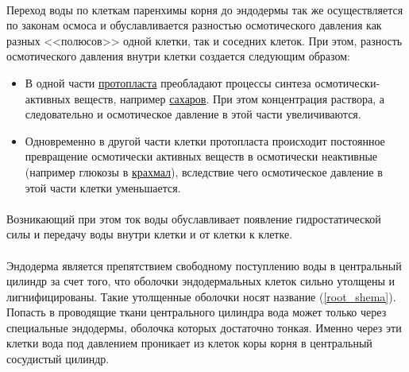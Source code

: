 \paragraph*{}Переход воды по клеткам паренхимы корня до эндодермы так же осуществляется по законам осмоса и обуславливается разностью осмотического давления как разных <<полюсов>> одной клетки, так и соседних клеток. При этом, разность осмотического давления внутри клетки создается следующим образом: 

\begin{itemize}

\item В одной части \hyperlink{protoplast}{протопласта} преобладают процессы синтеза осмотически-активных веществ, например \hyperlink{sect_glycosids}{сахаров}. При этом концентрация раствора, а следовательно и осмотическое давление в этой части увеличиваются.
\item Одновременно в другой части клетки протопласта происходит постоянное превращение осмотически активных веществ в осмотически неактивные (например глюкозы в \hyperlink{krahmal}{крахмал}), вследствие чего осмотическое давление в этой части клетки уменьшается.

\end{itemize}

\paragraph*{}Возникающий при этом ток воды обуславливает появление гидростатической силы и передачу воды внутри клетки и от клетки к клетке.



\paragraph*{}Эндодерма является препятствием свободному поступлению воды в центральный цилиндр за счет того, что оболочки эндодермальных клеток сильно утолщены и лигнифицированы. Такие утолщенные оболочки носят название  (\ris \ref{root_shema}). Попасть в проводящие ткани центрального цилиндра вода может только через специальные  эндодермы, оболочка которых достаточно тонкая. Именно через эти клетки вода под давлением проникает из клеток коры корня в центральный сосудистый цилиндр.


